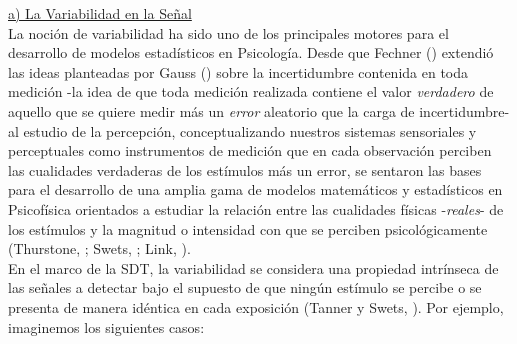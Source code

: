 
\underline{a) La Variabilidad en la Señal}\\

La noción de variabilidad ha sido uno de los principales motores para el desarrollo de modelos estadísticos en Psicología. Desde que Fechner (\citeyear{Fechner}) extendió las ideas planteadas por Gauss (\citeyear{Gauss}) sobre la incertidumbre contenida en toda medición -la idea de que toda medición realizada contiene el valor \textit{verdadero} de aquello que se quiere medir más un \textit{error} aleatorio que la carga de incertidumbre- al estudio de la percepción, conceptualizando nuestros sistemas sensoriales y perceptuales como instrumentos de medición que en cada observación perciben las cualidades verdaderas de los estímulos más un error, se sentaron las bases para el desarrollo de una amplia gama de modelos matemáticos y estadísticos en Psicofísica orientados a estudiar la relación entre las cualidades físicas -\textit{reales}- de los estímulos y la magnitud o intensidad con que se perciben psicológicamente (Thurstone, \citeyear{Thurstone1927}; Swets, \citeyear{Swets1973}; Link, \citeyear{Link1994}).\\

En el marco de la SDT, la variabilidad se considera una propiedad intrínseca de las señales a detectar bajo el supuesto de que ningún estímulo se percibe o se presenta de manera idéntica en cada exposición (Tanner y Swets, \citeyear{Tanner1954}). Por ejemplo, imaginemos los siguientes casos: \\


